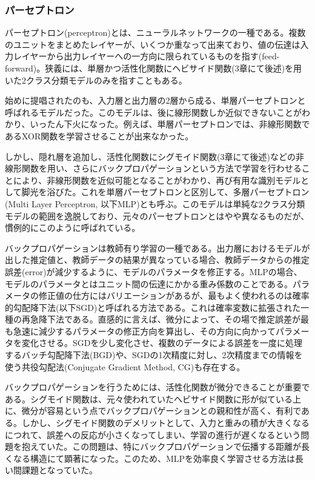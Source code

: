 \subsubsection{パーセプトロン}
パーセプトロン(perceptron)とは、ニューラルネットワークの一種である。複数のユニットをまとめたレイヤーが、いくつか重なって出来ており、値の伝達は入力レイヤーから出力レイヤーへの一方向に限られているものを指す(feed-forward)。狭義には、単層かつ活性化関数にヘビサイド関数(3章にて後述)を用いた2クラス分類モデルのみを指すこともある。\par
始めに提唱されたのも、入力層と出力層の2層から成る、単層パーセプトロンと呼ばれるモデルだった\cite{rosenblatt1958perceptron}。このモデルは、後に線形関数しか近似できないことがわかり、いったん下火になった\cite{minsky1988perceptrons:}。例えば、単層パーセプトロンでは、非線形関数であるXOR関数を学習させることが出来なかった。\par
しかし、隠れ層を追加し、活性化関数にシグモイド関数(3章にて後述)などの非線形関数を用い、さらにバックプロパゲーションという方法で学習を行わせることにより、非線形関数を近似可能となることがわかり、再び有用な識別モデルとして脚光を浴びた\cite{rumelhart1986learning}\cite{funahashi1989on-the-approximate}。これを単層パーセプトロンと区別して、多層パーセプトロン(Multi Layer Perceptron, 以下MLP)とも呼ぶ。このモデルは単純な2クラス分類モデルの範囲を逸脱しており、元々のパーセプトロンとはやや異なるものだが、慣例的にこのように呼ばれている。\par
バックプロパゲーションは教師有り学習の一種である。出力層におけるモデルが出した推定値と、教師データの結果が異なっている場合、教師データからの推定誤差(error)が減少するように、モデルのパラメータを修正する。MLPの場合、モデルのパラメータとはユニット間の伝達にかかる重み係数のことである。パラメータの修正値の仕方にはバリエーションがあるが、最もよく使われるのは確率的勾配降下法(以下SGD)と呼ばれる方法である。これは確率変数に拡張された一種の再急降下法である。直感的に言えば、微分によって、その場で推定誤差が最も急速に減少するパラメータの修正方向を算出し、その方向に向かってパラメータを変化させる。SGDを少し変化させ、複数のデータによる誤差を一度に処理するバッチ勾配降下法(BGD)や、SGDの1次精度に対し、2次精度までの情報を使う共役勾配法(Conjugate Gradient Method, CG)も存在する。\par
バックプロパゲーションを行うためには、活性化関数が微分できることが重要である。シグモイド関数は、元々使われていたヘビサイド関数に形が似ている上に、微分が容易という点でバックプロパゲーションとの親和性が高く、有利である。しかし、シグモイド関数のデメリットとして、入力と重みの積が大きくなるにつれて、誤差への反応が小さくなってしまい、学習の進行が遅くなるという問題を抱えていた。この問題は、特にバックプロパゲーションで伝播する距離が長くなる構造にて顕著になった\cite{hochreiter1998the-vanishing}\cite{hochreiter1998the-vanishing}。このため、MLPを効率良く学習させる方法は長い間課題となっていた。